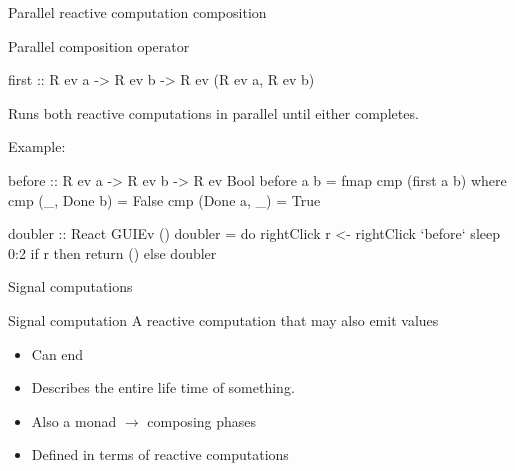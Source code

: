 \documentclass{beamer}
\begin{document}
\begin{frame}{Parallel reactive computation composition}
\begin{block}{Parallel composition operator}
\begin{code}
first :: R ev a -> R ev b -> R ev (R ev a, R ev b)
\end{code}
Runs both reactive computations in parallel until either
completes.
\end{block}

Example: 
\begin{code}
before :: R ev a -> R ev b -> R ev Bool
before a b = fmap cmp (first a b) 
  where  cmp (_, Done b) = False
         cmp (Done a, _) = True

doubler :: React GUIEv ()
doubler = do  rightClick
              r <- rightClick `before` sleep 0:2
              if r then return () else doubler
\end{code}
\end{frame}
\begin{frame}{Signal computations}
\begin{block}{Signal computation}
A reactive computation that may also \alert{emit} values
\begin{itemize}
\item Can \alert{end}
\item Describes the entire life time of something.
\item Also a monad $\rightarrow$ composing phases
\item Defined in terms of reactive computations
\end{itemize}

\end{block}
\end{frame}
\end{document}
